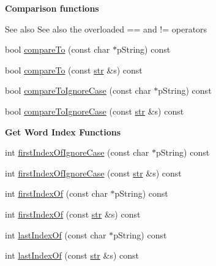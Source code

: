 \begin{Indent}{\bf Comparison functions}\par
{\em \begin{DoxySeeAlso}{See also}
See also the overloaded == and != operators 
\end{DoxySeeAlso}
}\begin{DoxyCompactItemize}
\item 
bool \hyperlink{classstr_a979667083c619213210e25fde716de87}{compare\+To} (const char $\ast$p\+String) const 
\item 
bool \hyperlink{classstr_a17d943c6c264a1acf743947ca2414c9f}{compare\+To} (const \hyperlink{classstr}{str} \&s) const 
\item 
bool \hyperlink{classstr_af96460c1173485c4b1cbdb0c5ed07476}{compare\+To\+Ignore\+Case} (const char $\ast$p\+String) const 
\item 
bool \hyperlink{classstr_a787c943c1a60f948cca7a16d198546e3}{compare\+To\+Ignore\+Case} (const \hyperlink{classstr}{str} \&s) const 
\end{DoxyCompactItemize}
\end{Indent}
\begin{Indent}{\bf Get Word Index Functions}\par
\begin{DoxyCompactItemize}
\item 
int \hyperlink{classstr_a8c713dcec83d50a71712ac00f5c01ddb}{first\+Index\+Of\+Ignore\+Case} (const char $\ast$p\+String) const 
\item 
int \hyperlink{classstr_a7f9fdf6b22d67550c9a9cff84ba60050}{first\+Index\+Of\+Ignore\+Case} (const \hyperlink{classstr}{str} \&s) const 
\item 
int \hyperlink{classstr_a9464f0d413646b055993c9b8a855f220}{first\+Index\+Of} (const char $\ast$p\+String) const 
\item 
int \hyperlink{classstr_ab6ae0bb7f4c37019357884f27ee4f07a}{first\+Index\+Of} (const \hyperlink{classstr}{str} \&s) const 
\item 
int \hyperlink{classstr_ad07c40095a491493ab9aa7ecf6a5b2c2}{last\+Index\+Of} (const char $\ast$p\+String) const 
\item 
int \hyperlink{classstr_a7c5e4efd38adf42c0b66e44a250c07ea}{last\+Index\+Of} (const \hyperlink{classstr}{str} \&s) const 
\end{DoxyCompactItemize}
\end{Indent}
